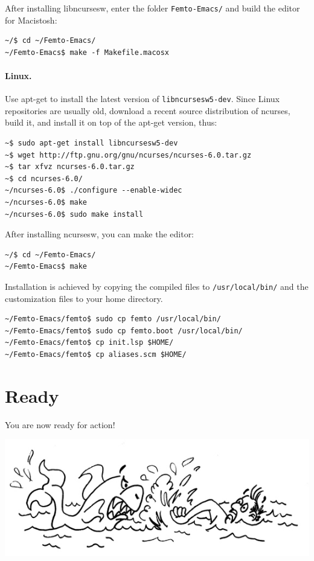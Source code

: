 \documentclass[a4paper,12pt]{book}
\begin{document}
After installing libncursesw, enter the folder \verb|Femto-Emacs/|
and build the editor for Macistosh:
\begin{verbatim}
~/$ cd ~/Femto-Emacs/ 
~/Femto-Emacs$ make -f Makefile.macosx
\end{verbatim}

\paragraph{Linux.} Use apt-get to install the
latest version of \verb|libncursesw5-dev|.
Since Linux repositories are usually old,
download a recent source distribution of ncurses,
build it, and install it on top of the
apt-get version, thus:
\begin{verbatim}
~$ sudo apt-get install libncursesw5-dev
~$ wget http://ftp.gnu.org/gnu/ncurses/ncurses-6.0.tar.gz
~$ tar xfvz ncurses-6.0.tar.gz
~$ cd ncurses-6.0/
~/ncurses-6.0$ ./configure --enable-widec
~/ncurses-6.0$ make
~/ncurses-6.0$ sudo make install
\end{verbatim}
After installing ncursesw, you can make the editor:
\begin{verbatim}
~/$ cd ~/Femto-Emacs/ 
~/Femto-Emacs$ make
\end{verbatim}

Installation is achieved by copying the
compiled files to \verb|/usr/local/bin/| and
the customization files to your home directory.
\begin{verbatim}
~/Femto-Emacs/femto$ sudo cp femto /usr/local/bin/ 
~/Femto-Emacs/femto$ sudo cp femto.boot /usr/local/bin/ 
~/Femto-Emacs/femto$ cp init.lsp $HOME/ 
~/Femto-Emacs/femto$ cp aliases.scm $HOME/
\end{verbatim}

\section{Ready}
You are now ready for action!

\includegraphics{figs-prefix/readyforaction.jpg}
\end{document}
